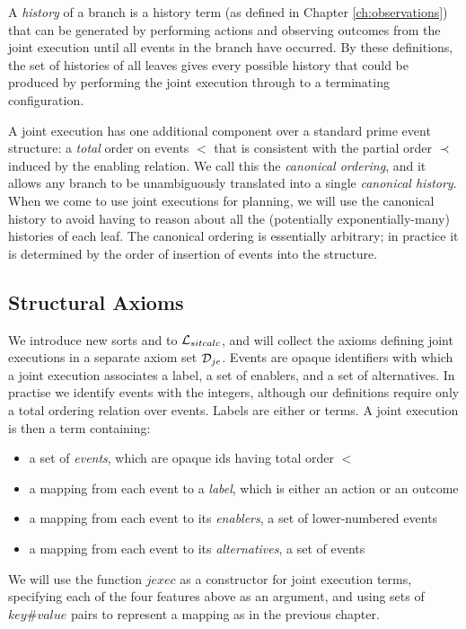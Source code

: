 A \emph{history} of a branch is a history term (as defined in Chapter
\ref{ch:observations}) that can be generated by performing actions
and observing outcomes from the joint execution until all events in
the branch have occurred. By these definitions, the set of histories
of all leaves gives every possible history that could be produced
by performing the joint execution through to a terminating configuration.

A joint execution has one additional component over a standard prime
event structure: a \emph{total} order on events $<$ that is consistent
with the partial order $\prec$ induced by the enabling relation.
We call this the \emph{canonical ordering}, and it allows any branch
to be unambiguously translated into a single \emph{canonical history}.
When we come to use joint executions for planning, we will use the
canonical history to avoid having to reason about all the (potentially
exponentially-many) histories of each leaf. The canonical ordering
is essentially arbitrary; in practice it is determined by the order
of insertion of events into the structure.


\subsection{Structural Axioms}

We introduce new sorts and  to $\mathcal{L}_{sitcalc}$,
and will collect the axioms defining joint executions in a separate
axiom set $\mathcal{D}_{je}$. Events are opaque identifiers with which a
joint execution associates a label, a set of enablers, and a set of
alternatives. In practise we identify events with the integers, although
our definitions require only a total ordering relation over events.
Labels are either  or  terms. A joint execution
is then a term containing:

\begin{itemize}
\item a set of \emph{events}, which are opaque ids having total order $<$ 
\item a mapping from each event to a \emph{label}, which is either an action
or an outcome 
\item a mapping from each event to its \emph{enablers}, a set of lower-numbered
events 
\item a mapping from each event to its \emph{alternatives}, a set of events 
\end{itemize}
We will use the function $jexec$ as a constructor for joint execution
terms, specifying each of the four features above as an argument,
and using sets of $key\#value$ pairs to represent a mapping as in
the previous chapter.

